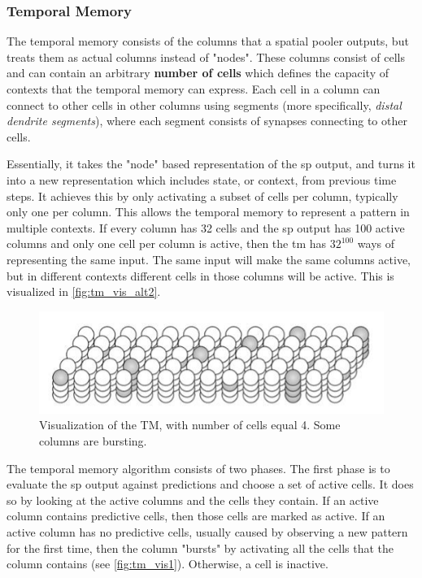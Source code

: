 \subsubsection{Temporal Memory}
\label{sec:temporal_memory}
The temporal memory consists of the columns that a spatial pooler outputs, but treats them as actual columns instead of "nodes". These columns consist of cells and can contain an arbitrary \textbf{number of cells} which defines the capacity of contexts that the temporal memory can express. Each cell in a column can connect to other cells in other columns using segments (more specifically, \emph{distal dendrite segments}), where each segment consists of synapses connecting to other cells.
\par
Essentially, it takes the "node" based representation of the \gls*{sp} output, and turns it into a new representation which includes state, or context, from previous time steps. It achieves this by only activating a subset of cells per column, typically only one per column. This allows the temporal memory to represent a pattern in multiple contexts. If every column has 32 cells and the \gls*{sp} output has 100 active columns and only one cell per column is active, then the \gls*{tm} has $32^{100}$ ways of representing the same input. The same input will make the same columns active, but in different contexts different cells in those columns will be active. This is visualized in \autoref{fig:tm_vis_alt2}.
\begin{figure}[htb]
    \centering
    \includegraphics[width=0.6\linewidth]{resources/related_works/tm_vis_alt2}
    \caption[Temporal Memory Visualization]{Visualization of the TM, with number of cells equal 4. Some columns are bursting.}
    \label{fig:tm_vis_alt2}
\end{figure}
\par
The temporal memory algorithm consists of two phases. The first phase is to evaluate the \gls*{sp} output against predictions and choose a set of active cells. It does so by looking at the active columns and the cells they contain. If an active column contains predictive cells, then those cells are marked as active. If an active column has no predictive cells, usually caused by observing a new pattern for the first time, then the column "bursts" by activating all the cells that the column contains (see \autoref{fig:tm_vis1}). Otherwise, a cell is inactive.
